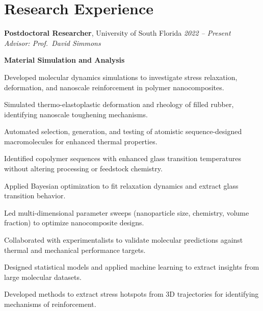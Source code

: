 \documentclass[letterpaper,12pt]{article}
\begin{document}
\vspace{-0.3\baselineskip}
\section*{Research Experience}

\textbf{Postdoctoral Researcher}, University of South Florida \hfill \textit{2022 – Present} \\
\textit{Advisor: Prof.~David Simmons}
\vspace{0.5em}

\textbf{Material Simulation and Analysis}
\begin{tabitemize}[leftmargin=*]
    \item Developed molecular dynamics simulations to investigate stress relaxation, deformation, and nanoscale reinforcement in polymer nanocomposites.
    \item Simulated thermo-elastoplastic deformation and rheology of filled rubber, identifying nanoscale toughening mechanisms.
    \item Automated selection, generation, and testing of atomistic sequence-designed macromolecules for enhanced thermal properties.
    \item Identified copolymer sequences with enhanced glass transition temperatures without altering processing or feedstock chemistry.
    \item Applied Bayesian optimization to fit relaxation dynamics and extract glass transition behavior.
    \item Led multi-dimensional parameter sweeps (nanoparticle size, chemistry, volume fraction) to optimize nanocomposite designs.
    \item Collaborated with experimentalists to validate molecular predictions against thermal and mechanical performance targets.
    \item Designed statistical models and applied machine learning to extract insights from large molecular datasets.
    \item Developed methods to extract stress hotspots from 3D trajectories for identifying mechanisms of reinforcement.
\end{tabitemize}
\end{document}
